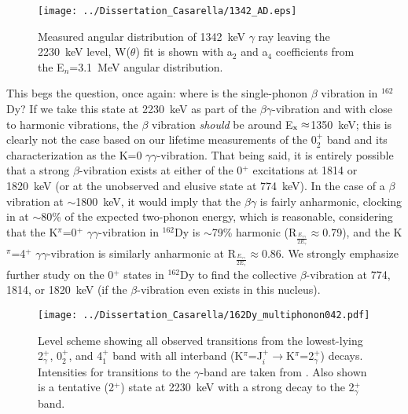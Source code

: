 
\begin{figure}[t]
\begin{center}
\texttt{[image: ../Dissertation\_Casarella/1342\_AD.eps]}
\caption{Measured angular distribution of 1342~keV $\gamma$ ray leaving the 2230~keV level, W($\theta$) fit is shown with a$_2$ and a$_4$ coefficients from the E$_n$=3.1~MeV angular distribution. \label{fig:1342_AD}}
\end{center}
\end{figure}

This begs the question, once again: where is the single-phonon $\beta$ vibration in $^{162}$Dy? If we take this state at 2230~keV as part of the $\beta\gamma$-vibration and with close to harmonic vibrations, the $\beta$ vibration \textit{should} be around E$_{\rm x}\approx$1350~keV; this is clearly not the case based on our lifetime measurements of the 0$^+_2$ band and its characterization as the K=0 $\gamma\gamma$-vibration. That being said, it is entirely possible that a strong $\beta$-vibration exists at either of the 0$^+$ excitations at 1814 or 1820~keV (or at the unobserved and elusive state at 774~keV). In the case of a $\beta$ vibration at $\sim$1800~keV, it would imply that the $\beta\gamma$ is fairly anharmonic, clocking in at $\sim$80\% of the expected two-phonon energy, which is reasonable, considering that the K$^\pi$=0$^+$ $\gamma\gamma$-vibration in $^{162}$Dy is $\sim$79\% harmonic (R$_{\frac{E_{\gamma\gamma}}{2E_\gamma}}\approx$0.79), and the K$^\pi$=4$^+$ $\gamma\gamma$-vibration is similarly anharmonic at R$_{\frac{E_{\gamma\gamma}}{2E_\gamma}}\approx$0.86. We strongly emphasize further study on the 0$^+$ states in $^{162}$Dy to find the collective $\beta$-vibration at 774, 1814, or 1820~keV (if the $\beta$-vibration even exists in this nucleus).

\begin{landscape}
\begin{figure}[t]
\begin{center}
\texttt{[image: ../Dissertation\_Casarella/162Dy\_multiphonon042.pdf]}
\caption{Level scheme showing all observed transitions from the lowest-lying 2$^+_\gamma$, 0$^+_2$, and 4$^+_1$ band with all interband (K$^\pi$=J$^+_i\rightarrow$K$^\pi$=2$^+_\gamma$) decays. Intensities for transitions to the $\gamma$-band are taken from \cite{Aprahamian200642}. Also shown is a tentative (2$^+$) state at 2230~keV with a strong decay to the 2$^+_\gamma$ band.
\label{fig:162Dy_multiphonon_042}}
\end{center}
\end{figure}
\end{landscape}

